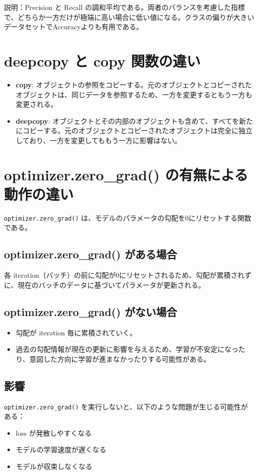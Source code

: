 \documentclass[a4paper,11pt]{article}
\begin{document}
説明：Precision と Recall の調和平均である。両者のバランスを考慮した指標で、どちらか一方だけが極端に高い場合に低い値になる。クラスの偏りが大きいデータセットでAccuracyよりも有用である。

\section{deepcopy と copy 関数の違い}

\begin{itemize}
    \item \textbf{copy}: オブジェクトの参照をコピーする。元のオブジェクトとコピーされたオブジェクトは、同じデータを参照するため、一方を変更するともう一方も変更される。
    
    \item \textbf{deepcopy}: オブジェクトとその内部のオブジェクトも含めて、すべてを新たにコピーする。元のオブジェクトとコピーされたオブジェクトは完全に独立しており、一方を変更してももう一方に影響はない。
\end{itemize}

\section{optimizer.zero\_grad() の有無による動作の違い}

\texttt{optimizer.zero\_grad()} は、モデルのパラメータの勾配を0にリセットする関数である。

\subsection{optimizer.zero\_grad() がある場合}
各 iteration（バッチ）の前に勾配が0にリセットされるため、勾配が累積されずに、現在のバッチのデータに基づいてパラメータが更新される。

\subsection{optimizer.zero\_grad() がない場合}
\begin{itemize}
    \item 勾配が iteration 毎に累積されていく。
    \item 過去の勾配情報が現在の更新に影響を与えるため、学習が不安定になったり、意図した方向に学習が進まなかったりする可能性がある。
\end{itemize}

\subsection{影響}
\texttt{optimizer.zero\_grad()} を実行しないと、以下のような問題が生じる可能性がある：
\begin{itemize}
    \item loss が発散しやすくなる
    \item モデルの学習速度が遅くなる
    \item モデルが収束しなくなる
\end{itemize}
\end{document}
